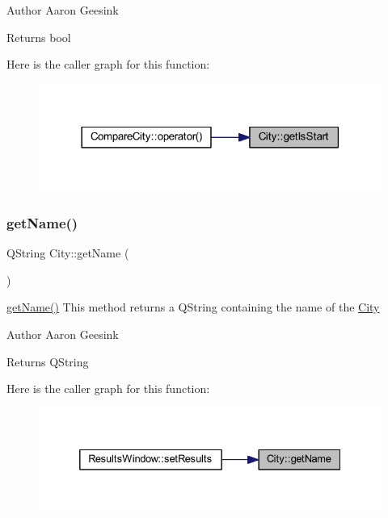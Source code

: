 \begin{DoxyAuthor}{Author}
Aaron Geesink 
\end{DoxyAuthor}
\begin{DoxyReturn}{Returns}
bool 
\end{DoxyReturn}
Here is the caller graph for this function\+:
\nopagebreak
\begin{figure}[H]
\begin{center}
\leavevmode
\includegraphics[width=318pt]{class_city_ae817fa08cc2191da09c91c3d6b4069d5_icgraph}
\end{center}
\end{figure}
\mbox{\label{class_city_afe733410d61155d8a4013293b0b72408}} 
\subsubsection{\texorpdfstring{getName()}{getName()}\hspace{0.1cm}{\footnotesize\ttfamily [1/2]}}
{\footnotesize\ttfamily Q\+String City\+::get\+Name (\begin{DoxyParamCaption}{ }\end{DoxyParamCaption})}



\mbox{\hyperlink{class_city_afe733410d61155d8a4013293b0b72408}{get\+Name()}} This method returns a Q\+String containing the name of the \mbox{\hyperlink{class_city}{City}} 

\begin{DoxyAuthor}{Author}
Aaron Geesink 
\end{DoxyAuthor}
\begin{DoxyReturn}{Returns}
Q\+String 
\end{DoxyReturn}
Here is the caller graph for this function\+:
\nopagebreak
\begin{figure}[H]
\begin{center}
\leavevmode
\includegraphics[width=332pt]{class_city_afe733410d61155d8a4013293b0b72408_icgraph}
\end{center}
\end{figure}
\mbox{\label{class_city_ad73598d937870a165cb530958106ff07}} 
